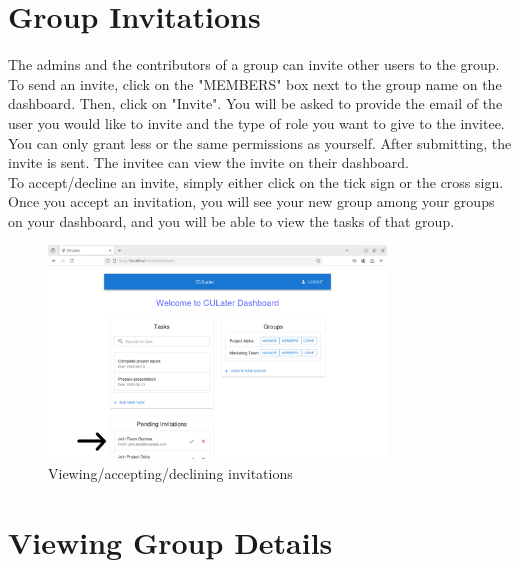 \documentclass{scrreprt}
\begin{document}
\chapter{Group Invitations}

The admins and the contributors of a group can invite other users to the group. To send an invite, click on the "MEMBERS" box next to the group name on the dashboard. Then, click on "Invite". You will be asked to provide the email of the user you would like to invite and the type of role you want to give to the invitee. You can only grant less or the same permissions as yourself. After submitting, the invite is sent. The invitee can view the invite on their dashboard.\\

To accept/decline an invite, simply either click on the tick sign or the cross sign. Once you accept an invitation, you will see your new group among your groups on your dashboard, and you will be able to view the tasks of that group.\\
\begin{figure}[htbp]
        \centering
        \includegraphics[width=0.8\textwidth]{invitation.png}
	\caption{Viewing/accepting/declining invitations}
	\label{fig:my_label}
\end{figure}


\chapter{Viewing Group Details}
\end{document}
